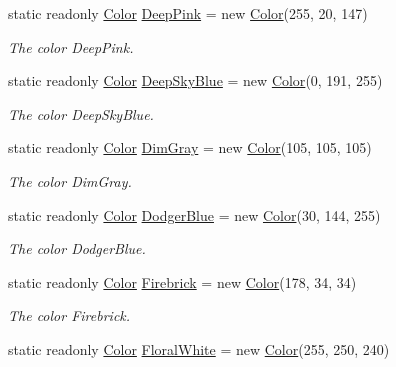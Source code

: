 \begin{DoxyCompactItemize}
static readonly \hyperlink{struct_tri_devs_1_1_tri_engine_1_1_color}{Color} \hyperlink{struct_tri_devs_1_1_tri_engine_1_1_color_a8189ae3da744cacf9a3a51be83d3a43f}{Deep\-Pink} = new \hyperlink{struct_tri_devs_1_1_tri_engine_1_1_color}{Color}(255, 20, 147)
\begin{DoxyCompactList}\small\item\em The color Deep\-Pink. \end{DoxyCompactList}\item 
static readonly \hyperlink{struct_tri_devs_1_1_tri_engine_1_1_color}{Color} \hyperlink{struct_tri_devs_1_1_tri_engine_1_1_color_a0e4663f60368cb26c632299d5ec16dde}{Deep\-Sky\-Blue} = new \hyperlink{struct_tri_devs_1_1_tri_engine_1_1_color}{Color}(0, 191, 255)
\begin{DoxyCompactList}\small\item\em The color Deep\-Sky\-Blue. \end{DoxyCompactList}\item 
static readonly \hyperlink{struct_tri_devs_1_1_tri_engine_1_1_color}{Color} \hyperlink{struct_tri_devs_1_1_tri_engine_1_1_color_a0dce529b66a749a1be6694eda81fad20}{Dim\-Gray} = new \hyperlink{struct_tri_devs_1_1_tri_engine_1_1_color}{Color}(105, 105, 105)
\begin{DoxyCompactList}\small\item\em The color Dim\-Gray. \end{DoxyCompactList}\item 
static readonly \hyperlink{struct_tri_devs_1_1_tri_engine_1_1_color}{Color} \hyperlink{struct_tri_devs_1_1_tri_engine_1_1_color_a10cc4fe3f0f5e1c27cc2a1f0aa8cf940}{Dodger\-Blue} = new \hyperlink{struct_tri_devs_1_1_tri_engine_1_1_color}{Color}(30, 144, 255)
\begin{DoxyCompactList}\small\item\em The color Dodger\-Blue. \end{DoxyCompactList}\item 
static readonly \hyperlink{struct_tri_devs_1_1_tri_engine_1_1_color}{Color} \hyperlink{struct_tri_devs_1_1_tri_engine_1_1_color_a184ce9caad503386de58a65baac4398d}{Firebrick} = new \hyperlink{struct_tri_devs_1_1_tri_engine_1_1_color}{Color}(178, 34, 34)
\begin{DoxyCompactList}\small\item\em The color Firebrick. \end{DoxyCompactList}\item 
static readonly \hyperlink{struct_tri_devs_1_1_tri_engine_1_1_color}{Color} \hyperlink{struct_tri_devs_1_1_tri_engine_1_1_color_a93ded427940b0600cd3e487a0f43bf3d}{Floral\-White} = new \hyperlink{struct_tri_devs_1_1_tri_engine_1_1_color}{Color}(255, 250, 240)

\end{DoxyCompactItemize}
